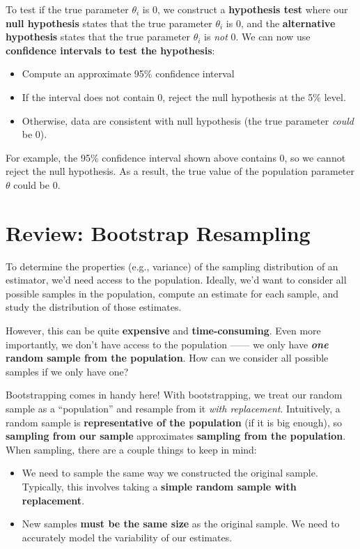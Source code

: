 \documentclass[
  letterpaper,
  DIV=11,
  numbers=noendperiod]{scrreprt}
\providecommand{\tightlist}{%
  \setlength{\itemsep}{0pt}\setlength{\parskip}{0pt}}\usepackage{longtable,booktabs,array}
\begin{document}
To test if the true parameter \(\theta_i\) is 0, we construct a
\textbf{hypothesis test} where our \textbf{null hypothesis} states that
the true parameter \(\theta_i\) is 0, and the \textbf{alternative
hypothesis} states that the true parameter \(\theta_i\) is \emph{not} 0.
We can now use \textbf{confidence intervals to test the hypothesis}:

\begin{itemize}
\tightlist
\item
  Compute an approximate 95\% confidence interval
\item
  If the interval does not contain 0, reject the null hypothesis at the
  5\% level.
\item
  Otherwise, data are consistent with null hypothesis (the true
  parameter \emph{could} be 0).
\end{itemize}

For example, the 95\% confidence interval shown above contains 0, so we
cannot reject the null hypothesis. As a result, the true value of the
population parameter \(\theta\) could be 0.

\section{Review: Bootstrap
Resampling}\label{review-bootstrap-resampling}

To determine the properties (e.g., variance) of the sampling
distribution of an estimator, we'd need access to the population.
Ideally, we'd want to consider all possible samples in the population,
compute an estimate for each sample, and study the distribution of those
estimates.

However, this can be quite \textbf{expensive} and
\textbf{time-consuming}. Even more importantly, we don't have access to
the population ------ we only have \textbf{\emph{one} random sample from
the population}. How can we consider all possible samples if we only
have one?

Bootstrapping comes in handy here! With bootstrapping, we treat our
random sample as a ``population'' and resample from it \emph{with
replacement}. Intuitively, a random sample is \textbf{representative of
the population} (if it is big enough), so \textbf{sampling from our
sample} approximates \textbf{sampling from the population}. When
sampling, there are a couple things to keep in mind:

\begin{itemize}
\tightlist
\item
  We need to sample the same way we constructed the original sample.
  Typically, this involves taking a \textbf{simple random sample with
  replacement}.
\item
  New samples \textbf{must be the same size} as the original sample. We
  need to accurately model the variability of our estimates.
\end{itemize}
\end{document}
